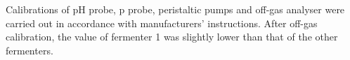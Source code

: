 
Calibrations of pH probe, p probe, peristaltic pumps and off-gas analyser were carried out in accordance with manufacturers' instructions. After off-gas calibration, the value of fermenter 1 was slightly lower than that of the other fermenters.

